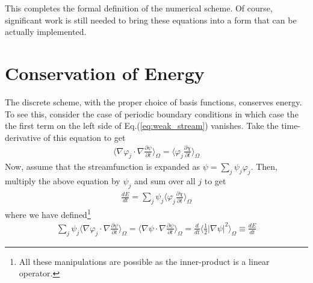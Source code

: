 \documentclass[11pt, reqno]{amsart}
\newcommand{\eqr}[1]{Eq.\thinspace(#1)}
\newcommand{\pfrac}[2]{\frac{\partial #1}{\partial #2}}
\newcommand{\iprod}[2]{\langle{#1}\rangle_{#2}}
\theoremstyle{definition}
\begin{document}
This completes the formal definition of the numerical scheme. Of
course, significant work is still needed to bring these equations into
a form that can be actually implemented.

\section{Conservation of Energy}

The discrete scheme, with the proper choice of basis functions,
conserves energy. To see this, consider the case of periodic boundary
conditions in which case the the first term on the left side of
\eqr{\ref{eq:weak_stream}} vanishes. Take the time-derivative of this
equation to get
\begin{align}
  \iprod{\nabla \varphi_j\cdot \nabla\pfrac{\psi}{t}}{\Omega}
  =
  \iprod{\varphi_j\pfrac{\chi}{t}}{\Omega}
\end{align}
Now, assume that the streamfunction is expanded as $\psi =
\sum_j\psi_j\varphi_j$. Then, multiply the above equation by $\psi_j$
and sum over all $j$ to get
\begin{align}
  \frac{dE}{dt}
  =
  \sum_j \psi_j \iprod{\varphi_j\pfrac{\chi}{t}}{\Omega}
\end{align}
where we have defined\footnote{All these manipulations are possible
  as the inner-product is a linear operator.}
\begin{align}
  \sum_j \psi_j \iprod{\nabla \varphi_j\cdot
    \nabla\pfrac{\psi}{t}}{\Omega}
  =
  \iprod{\nabla \psi\cdot \nabla\pfrac{\psi}{t}}{\Omega}  
  =
  \frac{d}{dt} \iprod{\frac{1}{2} |\nabla \psi|^2}{\Omega}
  \equiv
  \frac{dE}{dt}
\end{align}
\end{document}
